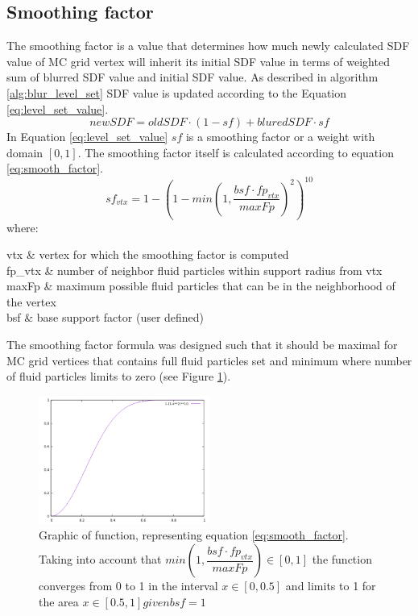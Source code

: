 \subsection{Smoothing factor} \label{sec:smoothing_factor}
The smoothing factor is a value that determines how much newly calculated SDF value of MC grid vertex will inherit its initial SDF value in terms of weighted sum of blurred SDF value and initial SDF value. As described in algorithm \ref{alg:blur_level_set} SDF value is updated according to the Equation \ref{eq:level_set_value}.
\begin{equation}
newSDF = oldSDF \cdot (1 - sf) + bluredSDF \cdot sf \label{eq:level_set_value}
\end{equation}
In Equation \ref{eq:level_set_value} $sf$ is a smoothing factor or a weight with domain $[0, 1]$. The smoothing factor itself is calculated according to equation \ref{eq:smooth_factor}.
\begin{equation}
	sf_{vtx} = 1 - (1 - min(1, \dfrac{bsf \cdot fp_{vtx}}{maxFp})^2)^{10} \label{eq:smooth_factor}
\end{equation}
where:
\begin{conditions}
	vtx & vertex for which the smoothing factor is computed\\
	fp_{vtx} & number of neighbor fluid particles within support radius from vtx\\
	maxFp & maximum possible fluid particles that can be in the neighborhood of the vertex \\
	bsf & base support factor (user defined)
\end{conditions}
The smoothing factor formula was designed such that it should be maximal for MC grid vertices that contains full fluid particles set and minimum where number of fluid particles limits to zero (see Figure \ref{fig:sf_function_graph}).
\begin{figure}[H]
	\begin{center}
			\includegraphics[width=0.5\textwidth]{figures/sf_function_graph.png}		
	\end{center}
	\caption{Graphic of function, representing equation \ref{eq:smooth_factor}. Taking into account that $min(1, \dfrac{bsf \cdot fp_{vtx}}{maxFp}) \in [0,1]$ the function converges from 0 to 1 in the interval $x \in [0, 0.5]$ and limits to 1 for the area $x\in [0.5, 1] given bsf = 1$}
	\label{fig:sf_function_graph}
\end{figure}

